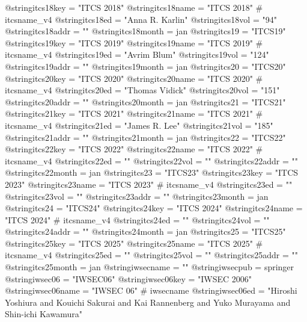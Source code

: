 @string{itcs18key =             "ITCS 2018"}
@string{itcs18name =            "ITCS 2018" # itcsname_v4}
@string{itcs18ed =              "Anna R. Karlin"}
@string{itcs18vol =             "94"}
@string{itcs18addr =            ""}
@string{itcs18month =           jan}
@string{itcs19 =                "ITCS19"}
@string{itcs19key =             "ITCS 2019"}
@string{itcs19name =            "ITCS 2019" # itcsname_v4}
@string{itcs19ed =              "Avrim Blum"}
@string{itcs19vol =             "124"}
@string{itcs19addr =            ""}
@string{itcs19month =           jan}
@string{itcs20 =                "ITCS20"}
@string{itcs20key =             "ITCS 2020"}
@string{itcs20name =            "ITCS 2020" # itcsname_v4}
@string{itcs20ed =              "Thomas Vidick"}
@string{itcs20vol =             "151"}
@string{itcs20addr =            ""}
@string{itcs20month =           jan}
@string{itcs21 =                "ITCS21"}
@string{itcs21key =             "ITCS 2021"}
@string{itcs21name =            "ITCS 2021" # itcsname_v4}
@string{itcs21ed =              "James R. Lee"}
@string{itcs21vol =             "185"}
@string{itcs21addr =            ""}
@string{itcs21month =           jan}
@string{itcs22 =                "ITCS22"}
@string{itcs22key =             "ITCS 2022"}
@string{itcs22name =            "ITCS 2022" # itcsname_v4}
@string{itcs22ed =              ""}
@string{itcs22vol =             ""}
@string{itcs22addr =            ""}
@string{itcs22month =           jan}
@string{itcs23 =                "ITCS23"}
@string{itcs23key =             "ITCS 2023"}
@string{itcs23name =            "ITCS 2023" # itcsname_v4}
@string{itcs23ed =              ""}
@string{itcs23vol =             ""}
@string{itcs23addr =            ""}
@string{itcs23month =           jan}
@string{itcs24 =                "ITCS24"}
@string{itcs24key =             "ITCS 2024"}
@string{itcs24name =            "ITCS 2024" # itcsname_v4}
@string{itcs24ed =              ""}
@string{itcs24vol =             ""}
@string{itcs24addr =            ""}
@string{itcs24month =           jan}
@string{itcs25 =                "ITCS25"}
@string{itcs25key =             "ITCS 2025"}
@string{itcs25name =            "ITCS 2025" # itcsname_v4}
@string{itcs25ed =              ""}
@string{itcs25vol =             ""}
@string{itcs25addr =            ""}
@string{itcs25month =           jan}
@string{iwsecname =             ""}
@string{iwsecpub =              springer}
@string{iwsec06 =               "IWSEC06"}
@string{iwsec06key =            "IWSEC 2006"}
@string{iwsec06name =           "IWSEC 06" # iwsecname}
@string{iwsec06ed =             "Hiroshi Yoshiura and Kouichi Sakurai and Kai Rannenberg and Yuko Murayama and Shin-ichi Kawamura"}
